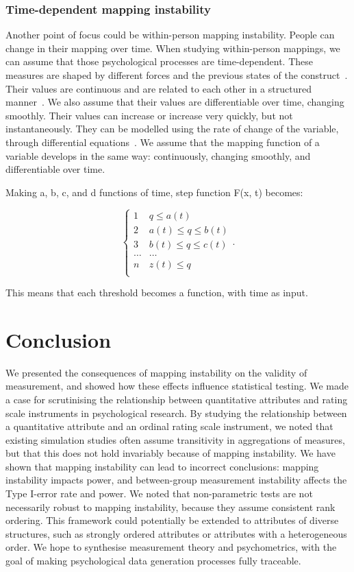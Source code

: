 \documentclass[titlepage, a4paper, 11pt]{article}
\begin{document}
\subsubsection{Time-dependent mapping instability}
Another point of focus could be within-person mapping instability. People can change in their mapping over time. When studying within-person mappings, we can assume that those psychological processes are time-dependent. These measures are shaped by different forces and the previous states of the construct~\citep{olthof_complexity_2020}. Their values are continuous and are related to each other in a structured manner~\citep{boker_consequences_2002}. We also assume that their values are differentiable over time, changing smoothly. Their values can increase or increase very quickly, but not instantaneously. They can be modelled using the rate of change of the variable, through differential equations~\citep{molenaar_new_2009}. We assume that the mapping function of a variable develops in the same way: continuously, changing smoothly, and differentiable over time.

Making a, b, c, and d functions of time, step function F(x, t) becomes: 

\[
\begin{cases} 
    1 & q \leq a(t)\\
    2 & a(t) \leq q \leq b(t)\\
    3 & b(t) \leq q \leq c(t)\\
    \ldots & \ldots\\    
    n & z(t) \leq q\\
\end{cases}.
\]

This means that each threshold becomes a function, with time as input. 

\section{Conclusion}
We presented the consequences of mapping instability on the validity of measurement, and showed how these effects influence statistical testing. We made a case for scrutinising the relationship between quantitative attributes and rating scale instruments in psychological research. By studying the relationship between a quantitative attribute and an ordinal rating scale instrument, we noted that existing simulation studies often assume transitivity in aggregations of measures, but that this does not hold invariably because of mapping instability. We have shown that mapping instability can lead to incorrect conclusions: mapping instability impacts power, and between-group measurement instability affects the Type I-error rate and power. We noted that non-parametric tests are not necessarily robust to mapping instability, because they assume consistent rank ordering. This framework could potentially be extended to attributes of diverse structures, such as strongly ordered attributes or attributes with a heterogeneous order. We hope to synthesise measurement theory and psychometrics, with the goal of making psychological data generation processes fully traceable.
\vspace{\fill}\pagebreak
\end{document}
